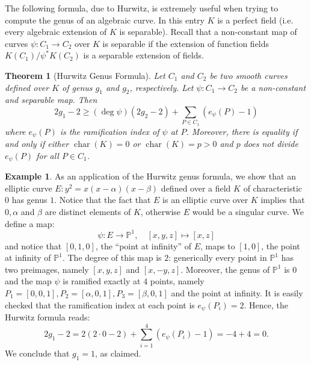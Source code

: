 \documentclass[12pt]{article}
\newtheorem*{thm}{Theorem}
\theoremstyle{definition}
\newtheorem*{exa}{Example}
\begin{document}
The following formula, due to Hurwitz, is extremely useful when trying to compute the genus of an algebraic curve. In this entry $K$ is a perfect field (i.e. every algebraic extension of $K$ is separable). Recall that a non-constant map of curves $\psi: C_1 \to C_2$ over $K$ is separable if the extension of function fields $K(C_1)/\psi^\ast K(C_2)$ is a separable extension of fields.

\begin{thm}[Hurwitz Genus Formula]
Let $C_1$ and $C_2$ be two smooth curves defined over $K$ of genus $g_1$ and $g_2$, respectively. Let $\psi : C_1 \to C_2$ be a non-constant and separable map.  Then 
$$2g_1-2 \geq (\deg \psi)(2g_2-2) + \sum_{P\in C_1} (e_{\psi}(P)-1)$$
where $e_{\psi}(P)$ is the ramification index of $\psi$ at $P$. Moreover, there is equality if and only if either $\operatorname{char}(K)=0$ or $\operatorname{char}(K)=p>0$ and $p$ does not divide $e_{\psi}(P)$ for all $P\in C_1$.
\end{thm}

\begin{exa}
As an application of the Hurwitz genus formula, we show that an elliptic curve $E : y^2=x(x-\alpha)(x-\beta)$ defined over a field $K$ of characteristic $0$ has genus $1$. Notice that the fact that $E$ is an elliptic curve over $K$ implies that $0,\alpha$ and $\beta$ are distinct elements of $K$, otherwise $E$ would be a singular curve. We define a map:
$$\psi : E \to \mathbb{P}^1, \quad [x,y,z] \mapsto [x,z]$$
and notice that $[0,1,0]$, the ``point at infinity'' of $E$, maps to $[1,0]$, the point at infinity of $\mathbb{P}^1$. The degree of this map is $2$: generically every point in $\mathbb{P}^1$ has two preimages, namely $[x,y,z]$ and $[x,-y,z]$. Moreover, the genus of $\mathbb{P}^1$ is $0$ and the map $\psi$ is ramified exactly at $4$ points, namely $P_1=[0,0,1], P_2=[\alpha,0,1], P_3=[\beta,0,1]$ and the point at infinity. It is easily checked that the ramification index at each point is $e_\psi(P_i)=2$. Hence, the Hurwitz formula reads:
$$2g_1-2=2(2\cdot 0 -2)+\sum_{i=1}^4(e_\psi(P_i)-1)=-4+4=0.$$
We conclude that $g_1=1$, as claimed.

\end{exa}
\end{document}
